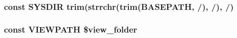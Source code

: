 \subsubsection[{S\+Y\+S\+D\+I\+R}]{\setlength{\rightskip}{0pt plus 5cm}const S\+Y\+S\+D\+I\+R trim(strrchr(trim({\bf B\+A\+S\+E\+P\+A\+T\+H}, \textquotesingle{}/\textquotesingle{}), \textquotesingle{}/\textquotesingle{}), \textquotesingle{}/\textquotesingle{})}\label{_admin_2index_8php_ab645ae0961792b1f2b4b83f89cb95fa5}
\hypertarget{_admin_2index_8php_ade8921d52af58583e5727833459224c3}{}
\subsubsection[{V\+I\+E\+W\+P\+A\+T\+H}]{\setlength{\rightskip}{0pt plus 5cm}const V\+I\+E\+W\+P\+A\+T\+H \$view\+\_\+folder}\label{_admin_2index_8php_ade8921d52af58583e5727833459224c3}
